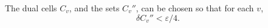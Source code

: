 The dual cells $C_v$, and the sets $C_v''$, can be chosen so that for each $v$,
$$\delta C_v'' < \varepsilon/4.$$
